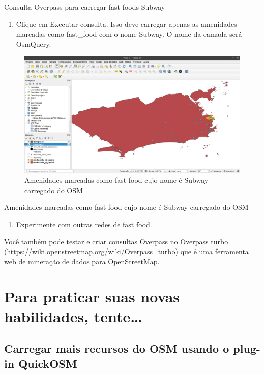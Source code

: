 \documentclass[
]{krantz}
\providecommand{\tightlist}{%
  \setlength{\itemsep}{0pt}\setlength{\parskip}{0pt}}
\begin{document}
Consulta Overpass para carregar fast foods Subway

\begin{enumerate}
\def\labelenumi{\arabic{enumi}.}
\setcounter{enumi}{3}
\tightlist
\item
  Clique em Executar consulta. Isso deve carregar apenas as amenidades marcadas como fast\_food com o nome Subway. O nome da camada será OsmQuery.
\end{enumerate}

\begin{figure}
\centering
\includegraphics{media/modulo3/overpass-3.png}
\caption{Amenidades marcadas como fast food cujo nome é Subway carregado do OSM}
\end{figure}

Amenidades marcadas como fast food cujo nome é Subway carregado do OSM

\begin{enumerate}
\def\labelenumi{\arabic{enumi}.}
\setcounter{enumi}{4}
\tightlist
\item
  Experimente com outras redes de fast food.
\end{enumerate}

Você também pode testar e criar consultas Overpass no Overpass turbo (\url{https://wiki.openstreetmap.org/wiki/Overpass_turbo}) que é uma ferramenta web de mineração de dados para OpenStreetMap.

\hypertarget{para-praticar-suas-novas-habilidades-tente-2}{%
\section{Para praticar suas novas habilidades, tente\ldots{}}\label{para-praticar-suas-novas-habilidades-tente-2}}

\hypertarget{carregar-mais-recursos-do-osm-usando-o-plug-in-quickosm}{%
\subsection{Carregar mais recursos do OSM usando o plug-in QuickOSM}\label{carregar-mais-recursos-do-osm-usando-o-plug-in-quickosm}}
\end{document}
